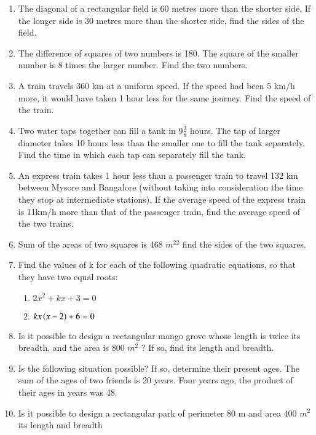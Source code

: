 \begin{enumerate}[label=\arabic*.,ref=\thesubsection.\theenumi]
\item The diagonal of a rectangular field is 60 metres more than the shorter side. If the longer side is 30 metres more than the shorter side, find the sides of the field.
\item The difference of squares of two numbers is 180. The square of the smaller number is 8 times the larger number. Find the two numbers.
\item A train travels 360 km at a uniform speed. If the speed had been 5 km/h more, it would have taken 1 hour less for the same journey. Find the speed of the train.
\item Two water taps together can fill a tank in 9$\frac{3}{ 8}$
hours. The tap of larger diameter takes 10
hours less than the smaller one to fill the tank separately. Find the time in which each tap can separately fill the tank.
\item An express train takes 1 hour less than a passenger train to travel 132 km between Mysore and Bangalore (without taking into consideration the time they stop at intermediate stations). If the average speed of the express train is 11km/h more than that of the passenger train, find the average speed of the two trains.
\item Sum of the areas of two squares is 468 $m^22$ find the sides of the two squares.
\item Find the values of k for each of the following quadratic equations, so that they have two equal roots:
\begin{enumerate}
\item 	$2x^2+kx+3 = 0$
\item 	$kx\left(x-2\right)+6= 0$
\end{enumerate}
\item Is it possible to design a rectangular mango grove whose length is twice its breadth, and the area is 800 $m^2$
? If so, find its length and breadth.
\item Is the following situation possible? If so, determine their present ages. The sum of the ages of two friends is 20 years. Four years ago, the product of their ages in years was 48.
\item Is it possible to design a rectangular park of perimeter 80 m and area 400 $m^2$ its length and breadth
\end{enumerate}
